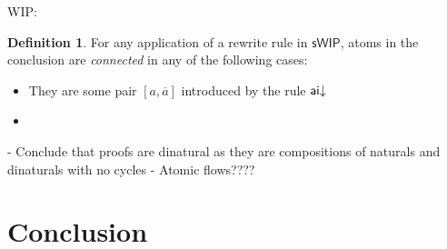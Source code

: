 \documentclass[11pt, oneside]{article}
\theoremstyle{plain}
\theoremstyle{definition}
\newtheorem{definition}[theorem]{Definition}
\newcommand{\sSys}{{\mathsf{sWIP}}}%
\begin{document}
WIP:
\begin{definition}
For any application of a rewrite rule in $\sSys$, atoms in the conclusion are \textit{connected} in any of the following cases:
\begin{itemize}
    \item They are some pair $[a,\overline{a}]$ introduced by the rule ${\mathsf {ai}}{\downarrow}$
    \item 
\end{itemize}
\end{definition}

- Conclude that proofs are dinatural as they are compositions of naturals and dinaturals with no cycles
- Atomic flows????

\newpage
\section{Conclusion}

\newpage


\end{document}
